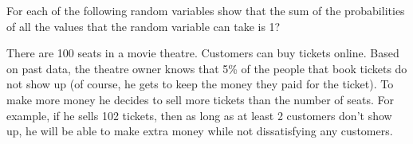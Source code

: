 \documentclass[solution,addpoints,12pt]{exam}
\begin{document}
\begin{questions}
\begin{parts}
\begin{solution}
\end{solution}

\end{parts}

\question For each of the following random variables show that the sum of the probabilities of all the values that the random variable can take is 1?


\question There are 100 seats in a movie theatre. Customers can buy tickets online. Based on past data, the theatre owner knows that 5\% of the people that book tickets do not show up (of course, he gets to keep the money they paid for the ticket). To make more money he decides to sell more tickets than the number of seats. For example, if he sells 102 tickets, then as long as at least 2 customers don't show up, he will be able to make extra money while not dissatisfying any customers. 


\end{questions}
\end{document}
